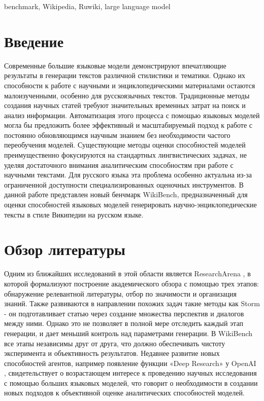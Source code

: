 \documentclass{article}
\theoremstyle{definition}
\theoremstyle{plain}
\begin{document}
\begin{altkeywords}
benchmark, Wikipedia, Ruwiki, large language model
\end{altkeywords}


\section*{Введение}

Современные большие языковые модели демонстрируют впечатляющие результаты в генерации текстов различной стилистики и тематики. 
Однако их способности к работе с научными и энциклопедическими материалами остаются малоизученными, особенно для русскоязычных текстов. 
Традиционные методы создания научных статей требуют значительных временных затрат на поиск и анализ информации. 
Автоматизация этого процесса с помощью языковых моделей могла бы предложить более эффективный и масштабируемый подход к работе с постоянно обновляющимся научным знанием без необходимости частого переобучения моделей.
Существующие методы оценки способностей моделей преимущественно фокусируются на стандартных лингвистических задачах, не уделяя достаточного внимания аналитическим способностям при работе с научными текстами.
Для русского языка эта проблема особенно актуальна из-за ограниченной доступности специализированных оценочных инструментов.
В данной работе представлен новый бенчмарк WikiBench, предназначенный для оценки способностей языковых моделей генерировать научно-энциклопедические тексты в стиле Википедии на русском языке. 

\section*{Обзор литературы}
Одним из ближайших исследований в этой области является ResearchArena \cite{resar}, в которой формализуют построение академического обзора с помощью трех этапов:
обнаружение релевантной литературы, отбор по значимости и организация знаний.
Также развиваются в направлении похожих задач такие методы как Storm \cite{storm} - он подготавливает статью через создание множества перспектив и диалогов между ними.
Однако это не позволяет в полной мере отследить каждый этап генерации, и дает меньший контроль над параметрами генерации. В WikiBench все этапы независимы друг от друга, 
что должно обеспечивать чистоту эксперимента и объективность результатов.
Недавнее развитие новых способностей агентов, например появление функции «Deep Research» у OpenAI \cite{deepr}, 
свидетельствует о возрастающем интересе к проведению научных исследования с помощью больших языковых моделей, 
что говорит о необходимости в создании новых подходов к объективной оценке аналитических способностей моделей. 
\end{document}
